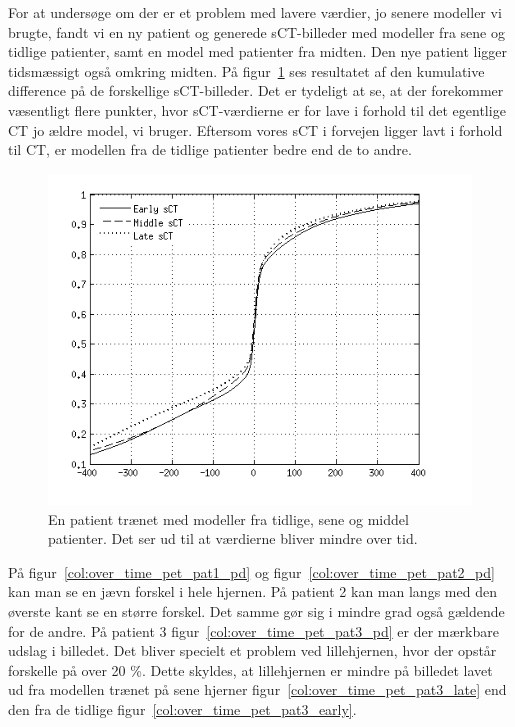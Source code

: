 For at undersøge om der er et problem med lavere værdier, jo senere modeller vi brugte, fandt vi en ny patient og generede sCT-billeder med modeller fra sene og tidlige patienter, samt en model med patienter fra midten. Den nye patient ligger tidsmæssigt også omkring midten. På figur~\ref{cumm_diff_over_tid} ses resultatet af den kumulative difference på de forskellige sCT-billeder. Det er tydeligt at se, at der forekommer væsentligt flere punkter, hvor sCT-værdierne er for lave i forhold til det egentlige CT jo ældre model, vi bruger. Eftersom vores sCT i forvejen ligger lavt i forhold til CT, er modellen fra de tidlige patienter bedre end de to andre.

\begin{figure}
    \includegraphics[width=\textwidth]{billeder/cumm_diff_over_tid.png}
    \caption{En patient trænet med modeller fra tidlige, sene og middel patienter. Det ser ud til at værdierne bliver mindre over tid.}
    \label{cumm_diff_over_tid}
\end{figure}

På figur~\ref{col:over_time_pet_pat1_pd} og
figur~\ref{col:over_time_pet_pat2_pd} kan man se en jævn forskel i hele
hjernen. På patient 2 kan man langs med den øverste kant se en større
forskel. Det samme gør sig i mindre grad også gældende for de andre.
På patient 3 figur~\ref{col:over_time_pet_pat3_pd} er der mærkbare
udslag i billedet. Det bliver specielt et problem ved lillehjernen, hvor
der opstår forskelle på over 20 \%. Dette skyldes, at lillehjernen
er mindre på billedet lavet ud fra modellen trænet på sene hjerner
figur~\ref{col:over_time_pet_pat3_late} end den fra de tidlige
figur~\ref{col:over_time_pet_pat3_early}.

